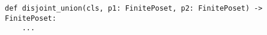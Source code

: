 \begin{verbatim}
def disjoint_union(cls, p1: FinitePoset, p2: FinitePoset) -> FinitePoset:
    ...
\end{verbatim}